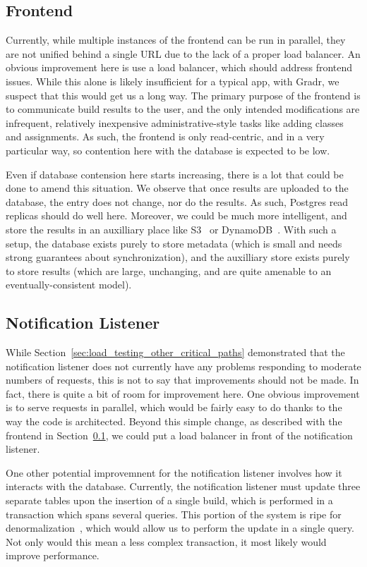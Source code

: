 \documentclass{scrartcl}
\begin{document}
\subsection{Frontend}
\label{sec:improve_frontend}

Currently, while multiple instances of the frontend can be run in parallel, they are not unified behind a single URL due to the lack of a proper load balancer.
An obvious improvement here is use a load balancer, which should address frontend issues.
While this alone is likely insufficient for a typical app, with Gradr, we suspect that this would get us a long way.
The primary purpose of the frontend is to communicate build results to the user, and the only intended modifications are infrequent, relatively inexpensive administrative-style tasks like adding classes and assignments.
As such, the frontend is only read-centric, and in a very particular way, so contention here with the database is expected to be low.

Even if database contension here starts increasing, there is a lot that could be done to amend this situation.
We observe that once results are uploaded to the database, the entry does not change, nor do the results.
As such, Postgres read replicas should do well here.
Moreover, we could be much more intelligent, and store the results in an auxilliary place like S3~\cite{s3} or DynamoDB~\cite{dynamodb}.
With such a setup, the database exists purely to store metadata (which is small and needs strong guarantees about synchronization), and the auxilliary store exists purely to store results (which are large, unchanging, and are quite amenable to an eventually-consistent model).

\subsection{Notification Listener}
While Section~\ref{sec:load_testing_other_critical_paths} demonstrated that the notification listener does not currently have any problems responding to moderate numbers of requests, this is not to say that improvements should not be made.
In fact, there is quite a bit of room for improvement here.
One obvious improvement is to serve requests in parallel, which would be fairly easy to do thanks to the way the code is architected.
Beyond this simple change, as described with the frontend in Section~\ref{sec:improve_frontend}, we could put a load balancer in front of the notification listener.

One other potential improvemnent for the notification listener involves how it interacts with the database.
Currently, the notification listener must update three separate tables upon the insertion of a single build, which is performed in a transaction which spans several queries.
This portion of the system is ripe for denormalization~\cite{denormalization}, which would allow us to perform the update in a single query.
Not only would this mean a less complex transaction, it most likely would improve performance.
\end{document}
